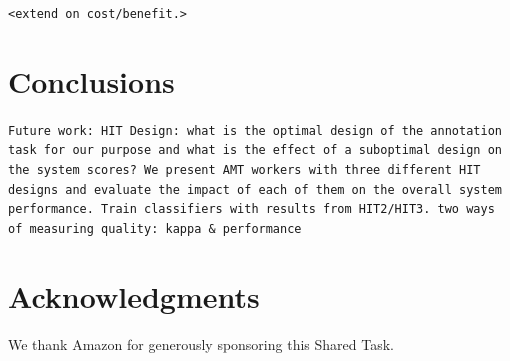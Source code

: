 \documentclass[11pt,letterpaper]{article}
\begin{document}
\texttt{<extend on cost/benefit.>}

\section{Conclusions}
\label{sect:conclusions}
\texttt{Future work: HIT Design: what is the optimal design of the annotation task for our purpose and what is the effect of a suboptimal design on the system scores? We present AMT workers with three different HIT designs and evaluate the impact of each of them on the overall system performance. Train classifiers with results from HIT2/HIT3. two ways of measuring quality: kappa \& performance}

\section*{Acknowledgments}
We thank Amazon for generously sponsoring this Shared Task.



\end{document}
